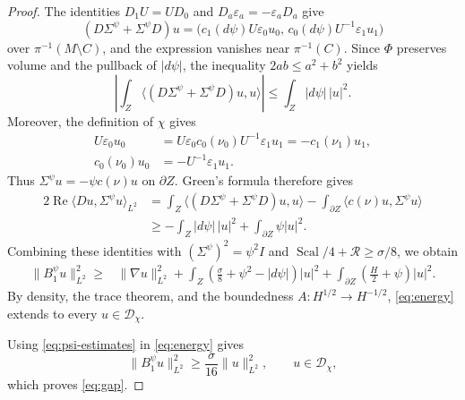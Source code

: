 \documentclass[12pt,reqno]{amsart}
\numberwithin{equation}{section}
\theoremstyle{definition}
\newcommand{\Sc}{\operatorname{Scal}}
\newcommand{\cR}{\mathcal R}
\begin{document}
\begin{proof}
The identities $D_1U=UD_0$ and
$D_a\varepsilon_a=-\varepsilon_aD_a$ give
\[
 (D\Sigma^\psi+\Sigma^\psi D)u
 =\bigl(c_1(d\psi)U\varepsilon_0u_0,\,
         c_0(d\psi)U^{-1}\varepsilon_1u_1\bigr)
\]
over $\pi^{-1}(M\setminus C)$, and the expression vanishes near $\pi^{-1}(C)$.  Since $\Phi$
preserves volume and the pullback of $|d\psi|$, the inequality
$2ab\leq a^2+b^2$ yields
\[
 \left|\int_Z\langle(D\Sigma^\psi+\Sigma^\psi D)u,u\rangle\right|
 \leq\int_Z|d\psi|\,|u|^2.
\]
Moreover, the definition of $\chi$ gives
\[
 \begin{aligned}
 U\varepsilon_0u_0
 &=U\varepsilon_0c_0(\nu_0)U^{-1}\varepsilon_1u_1
   =-c_1(\nu_1)u_1,\\
 c_0(\nu_0)u_0&=-U^{-1}\varepsilon_1u_1.
 \end{aligned}
\]
Thus $\Sigma^\psi u=-\psi c(\nu)u$ on $\partial Z$.
Green's formula therefore gives
\[
 \begin{aligned}
 2\operatorname{Re}\langle Du,\Sigma^\psi u\rangle_{L^2}
 &=\int_Z\langle(D\Sigma^\psi+\Sigma^\psi D)u,u\rangle
   -\int_{\partial Z}\langle c(\nu)u,\Sigma^\psi u\rangle\\
 &\geq-\int_Z|d\psi|\,|u|^2
        +\int_{\partial Z}\psi|u|^2.
 \end{aligned}
\]
Combining these identities with $(\Sigma^\psi)^2=\psi^2I$ and
$\Sc/4+\cR\geq\sigma/8$, we obtain
\begin{equation}\label{eq:energy}
 \begin{aligned}
 \|B_1^\psi u\|_{L^2}^2
 \geq{}&\|\nabla u\|_{L^2}^2
 +\int_Z\left(\frac{\sigma}{8}+\psi^2-|d\psi|\right)|u|^2
 +\int_{\partial Z}\left(\frac H2+\psi\right)|u|^2.
 \end{aligned}
\end{equation}
By density, the trace theorem, and the boundedness
$A:H^{1/2}\to H^{-1/2}$, \eqref{eq:energy} extends to every
$u\in\mathcal D_\chi$.

Using \eqref{eq:psi-estimates} in \eqref{eq:energy} gives
\[
 \|B_1^\psi u\|_{L^2}^2
 \geq\frac{\sigma}{16}\|u\|_{L^2}^2,
 \qquad u\in\mathcal D_\chi,
\]
which proves \eqref{eq:gap}.
\end{proof}


\end{document}
